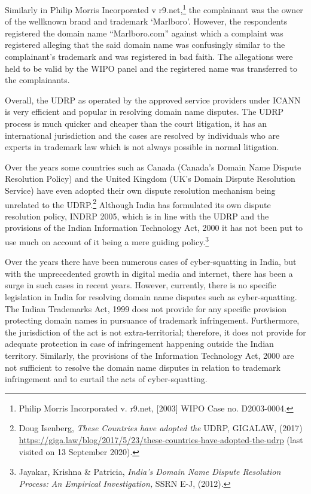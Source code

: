 \begin{multicols}{2}
\noi
Similarly in Philip Morris Incorporated v r9.net,\footnote{Philip Morris Incorporated v. r9.net, [2003] WIPO Case no. D2003-0004.} the complainant was the owner of the wellknown brand and trademark ‘Marlboro’. However, the respondents registered the domain
name “Marlboro.com” against which a complaint was registered alleging that the said domain
name was confusingly similar to the complainant’s trademark and was registered in bad faith.
The allegations were held to be valid by the WIPO panel and the registered name was
transferred to the complainants.

\noi
Overall, the UDRP as operated by the approved service providers under ICANN is very
efficient and popular in resolving domain name disputes. The UDRP process is much quicker
and cheaper than the court litigation, it has an international jurisdiction and the cases are
resolved by individuals who are experts in trademark law which is not always possible in
normal litigation.

\noi
Over the years some countries such as Canada (Canada’s Domain Name Dispute Resolution
Policy) and the United Kingdom (UK’s Domain Dispute Resolution Service) have even
adopted their own dispute resolution mechanism being unrelated to the UDRP.\footnote{Doug Isenberg, \textit{These Countries have adopted the} UDRP, GIGALAW, (2017)  \url{https://giga.law/blog/2017/5/23/these-countries-have-adopted-the-udrp} (last visited on 13 September 2020). } Although India has formulated its own dispute resolution policy, INDRP 2005, which is in line with the
UDRP and the provisions of the Indian Information Technology Act, 2000 it has not been put
to use much on account of it being a mere guiding policy.\footnote{Jayakar, Krishna \& Patricia, \textit{India’s Domain Name Dispute Resolution Process: An Empirical Investigation,} SSRN E-J, (2012).}


\noi
Over the years there have been numerous cases of cyber-squatting in India, but with the
unprecedented growth in digital media and internet, there has been a surge in such cases in
recent years. However, currently, there is no specific legislation in India for resolving domain
name disputes such as cyber-squatting. The Indian Trademarks Act, 1999 does not provide
for any specific provision protecting domain names in pursuance of trademark infringement.
Furthermore, the jurisdiction of the act is not extra-territorial; therefore, it does not provide
for adequate protection in case of infringement happening outside the Indian territory.
Similarly, the provisions of the Information Technology Act, 2000 are not sufficient to resolve the domain name disputes in relation to trademark infringement and to curtail the acts of cyber-squatting. 


\end{multicols}
